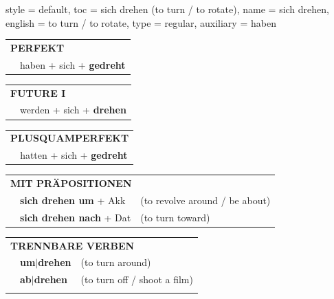 \begin{verbentry}{
  style = {default},
  toc = {sich drehen (to turn / to rotate)},
  name = {sich drehen},
  english = {to turn / to rotate},
  type = {regular},
  auxiliary = {haben}
}
 \begin{tabular}{rl}
     \multicolumn{2}{l}{\textbf{PERFEKT}}\\
   & haben + sich + \textbf{gedreht}\\
  \end{tabular}
\hfill
   \begin{tabular}{rl}
    \multicolumn{2}{l}{\textbf{FUTURE I} }\\
   & werden + sich + \textbf{drehen}\\
  \end{tabular}
\hfill
   \begin{tabular}{rl}
      \multicolumn{2}{l}{\textbf{PLUSQUAMPERFEKT}}\\
   & hatten + sich + \textbf{gedreht}\\
  \end{tabular}

   \vspace{10pt}

   \begin{tabular}{lll}
      \multicolumn{3}{l}{\textbf{MIT PRÄPOSITIONEN}}\\
& \textbf{sich drehen um} + Akk & (to revolve around / be about)\\
& \textbf{sich drehen nach} + Dat & (to turn toward)\\
\end{tabular}
  \hfill
   \begin{tabular}{lll}
      \multicolumn{3}{l}{\textbf{TRENNBARE VERBEN}}\\
 & \textbf{um$|$drehen} & (to turn around)\\
 & \textbf{ab$|$drehen} & (to turn off / shoot a film)\\
\vspace{10pt}
  \end{tabular}

  \vspace{-5pt}
\end{verbentry}

